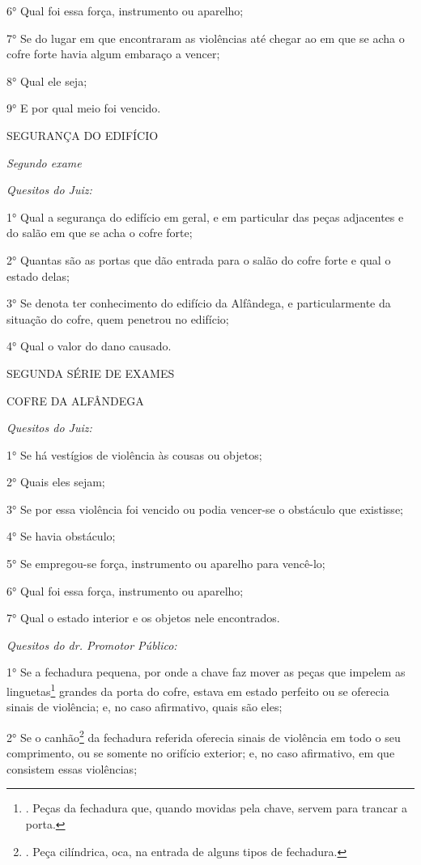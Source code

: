 6° Qual foi essa força, instrumento ou aparelho;

7° Se do lugar em que encontraram as violências até chegar ao em que se
acha o cofre forte havia algum embaraço a vencer;

8° Qual ele seja;

9° E por qual meio foi vencido.

SEGURANÇA DO EDIFÍCIO

\emph{Segundo exame}

\emph{Quesitos do Juiz:}

1° Qual a segurança do edifício em geral, e em particular das peças
adjacentes e do salão em que se acha o cofre forte;

2° Quantas são as portas que dão entrada para o salão do cofre forte e
qual o estado delas;

3° Se denota ter conhecimento do edifício da Alfândega, e
particularmente da situação do cofre, quem penetrou no edifício;

4° Qual o valor do dano causado.

SEGUNDA SÉRIE DE EXAMES

COFRE DA ALFÂNDEGA

\emph{Quesitos do Juiz:}

1° Se há vestígios de violência às cousas ou objetos;

2° Quais eles sejam;

3° Se por essa violência foi vencido ou podia vencer-se o obstáculo que
existisse;

4° Se havia obstáculo;

5° Se empregou-se força, instrumento ou aparelho para vencê-lo;

6° Qual foi essa força, instrumento ou aparelho;

7° Qual o estado interior e os objetos nele encontrados.

\emph{Quesitos do dr. Promotor Público:}

1° Se a fechadura pequena, por onde a chave faz mover as peças que
impelem as linguetas\footnote{. Peças da fechadura que, quando movidas
  pela chave, servem para trancar a porta.} grandes da porta do cofre,
estava em estado perfeito ou se oferecia sinais de violência; e, no caso
afirmativo, quais são eles;

2° Se o canhão\footnote{. Peça cilíndrica, oca, na entrada de alguns
  tipos de fechadura.} da fechadura referida oferecia sinais de
violência em todo o seu comprimento, ou se somente no orifício exterior;
e, no caso afirmativo, em que consistem essas violências;

